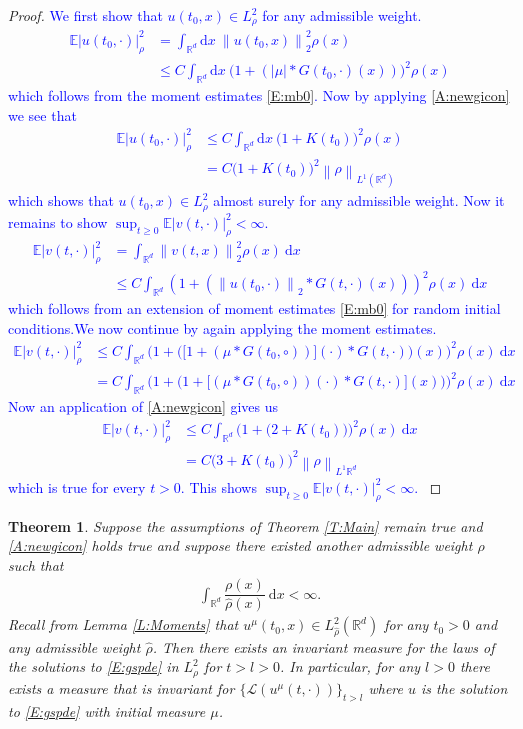 \documentclass[a4paper,11pt]{article}%
\numberwithin{equation}{section}
\theoremstyle{plain}
\newtheorem{theorem}{Theorem}[section]
\theoremstyle{definition}
\newcommand{\R}{\mathbb{R}}
\newcommand{\E}{\mathbb{E}}
\newcommand{\Norm}[1]{\left\|  #1   \right\|}
\newcommand{\ud}{\ensuremath{ \mathrm{d} }}
\begin{document}
\begin{proof} \textcolor{blue}{
We first show that $u(t_0,x)\in L^2_\rho$ for any admissible weight.
\begin{align*}
\E |u(t_0,\cdot)|_\rho^2 &= \int_{\R^d}\ud x \: \Norm{u(t_0,x)}_2^2\rho(x)
\\& \le C  \int_{\R^d}\ud x \: \big(1+(|\mu|*G(t_0,\cdot)(x))\big)^2\rho(x)
\end{align*}
which follows from the moment estimates \eqref{E:mb0}. Now by applying \eqref{A:newgicon} we see that
\begin{align*}
\E |u(t_0,\cdot)|_\rho^2 & \le C \int_{\R^d}\ud x \: \big(1+K(t_0)\big)^2\rho(x)
\\& = C\big(1+K(t_0)\big)^2\Norm{\rho}_{L^1(\R^d)}
\end{align*}
which shows that $u(t_0,x)\in L^2_\rho$ almost surely for any admissible weight. Now it remains to show $\sup_{t\ge 0} \E |v(t,\cdot)|_\rho^2 < \infty$.
\begin{align*}
\E |v(t,\cdot)|_\rho^2 &= \int_{\R^d}\Norm{v(t,x)}_2^2\rho(x) \: \ud x
\\& \le C \int_{\R^d} \left( 1+\left( \Norm{u(t_0,\cdot)}_2 * G(t,\cdot)(x) \right) \right)^2\rho(x) \: \ud x
\end{align*}
which follows from an extension of moment estimates \eqref{E:mb0} for random initial conditions.We now continue by again applying the moment estimates.
\begin{align*}
\E |v(t,\cdot)|_\rho^2 & \le C \int_{\R^d} \bigg( 1+ \big(\big[1+(\mu*G(t_0,\circ))\big](\cdot) * G(t,\cdot)\big)(x)  \bigg)^2\rho(x) \: \ud x
\\& = C \int_{\R^d} \bigg( 1+\bigg( 1+\big[(\mu*G(t_0,\circ))(\cdot) * G(t,\cdot)\big](x) \bigg) \bigg)^2\rho(x) \: \ud x
\end{align*}
Now an application of \eqref{A:newgicon} gives us
\begin{align*}
\E |v(t,\cdot)|_\rho^2 &\le C \int_{\R^d} \bigg( 1+\bigg( 2+K(t_0) \bigg) \bigg)^2\rho(x) \: \ud x
\\&= C\bigg( 3 +K(t_0) \bigg)^2 \Norm{\rho}_{L^1{\R^d}}
\end{align*}
which is true for every $t>0$. This shows $\sup_{t\ge 0} \E |v(t,\cdot)|_\rho^2 < \infty$.
}
\end{proof}

\begin{theorem}
	\label{T:Main2}
	Suppose the assumptions of Theorem \ref{T:Main} remain true and \eqref{A:newgicon} holds true and suppose there existed
	another admissible weight $\hat{\rho}$ such that
	\begin{align*}
		\int_{\R^d}\dfrac{\rho(x)}{\hat\rho(x)}\: \ud x < \infty.
	\end{align*}
	Recall from Lemma \ref{L:Moments} that $u^\mu(t_0,x) \in L^2_{\hat\rho}(\R^d)$ for any $t_0 >0$ and any
	admissible weight $\hat{\rho}$. Then there exists an invariant measure for the laws of the solutions to
	\eqref{E:gspde} in $L^2_\rho$ for $t>l>0$. In particular, for any $l>0$ there exists a measure that is
	invariant for $\{\mathscr L (u^\mu(t,\cdot))\}_{t>l}$ where $u$ is the solution to \eqref{E:gspde} with
	initial measure $\mu$.
\end{theorem}
\end{document}
